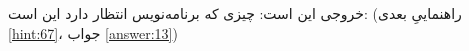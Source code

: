 \section{}
\paragraph{}\label{hint:290}
خروجی این است:
\LTR\noindent
{}
\RTL
چیزی که برنامه‌نویس انتظار دارد این است:
\LTR\noindent
{}
\RTL
(راهنماییِ بعدی \ref{hint:67}، جواب \ref{answer:13})